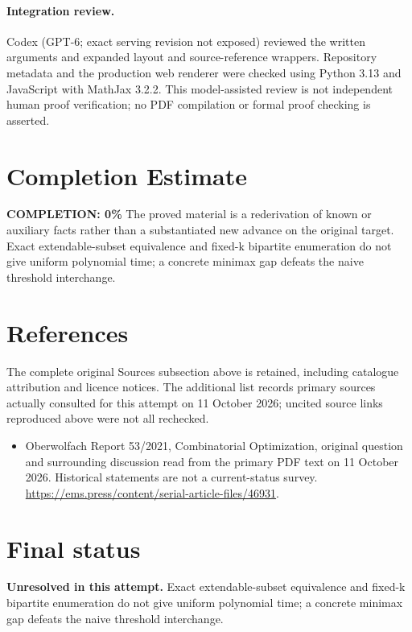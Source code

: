 \documentclass[11pt]{article}
\begin{document}
\paragraph{Integration review.} Codex (GPT-6; exact serving revision not exposed) reviewed the written arguments and expanded layout and source-reference wrappers. Repository metadata and the production web renderer were checked using Python 3.13 and JavaScript with MathJax 3.2.2. This model-assisted review is not independent human proof verification; no PDF compilation or formal proof checking is asserted.

\section{Completion Estimate}
\noindent\textbf{COMPLETION: 0\%}
The proved material is a rederivation of known or auxiliary facts rather than a substantiated new advance on the original target. Exact extendable-subset equivalence and fixed-k bipartite enumeration do not give uniform polynomial time; a concrete minimax gap defeats the naive threshold interchange.
\section{References}
The complete original Sources subsection above is retained, including catalogue attribution and licence notices. The additional list records primary sources actually consulted for this attempt on 11 October 2026; uncited source links reproduced above were not all rechecked.
\begin{itemize}
\item Oberwolfach Report 53/2021, Combinatorial Optimization, original question and surrounding discussion read from the primary PDF text on 11 October 2026. Historical statements are not a current-status survey. \url{https://ems.press/content/serial-article-files/46931}.
\end{itemize}
\section{Final status}
\textbf{Unresolved in this attempt.} Exact extendable-subset equivalence and fixed-k bipartite enumeration do not give uniform polynomial time; a concrete minimax gap defeats the naive threshold interchange.
\end{document}
